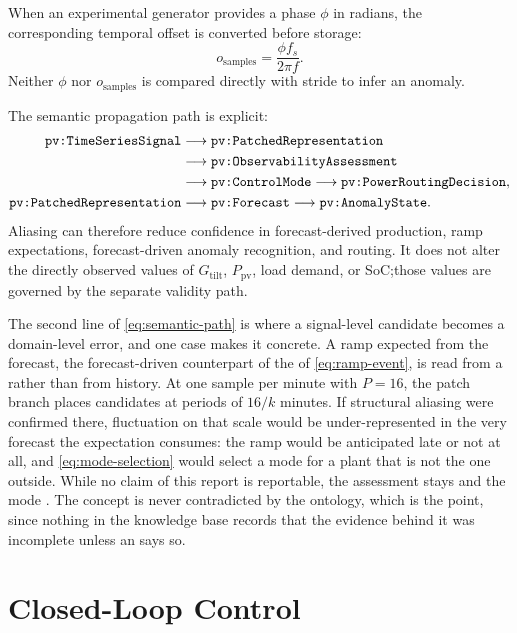 When an experimental generator provides a phase $\phi$ in radians, the corresponding temporal offset is converted before storage:
\begin{equation*}
o_{\mathrm{samples}}=\frac{\phi f_s}{2\pi f}.
\end{equation*}
Neither $\phi$ nor $o_{\mathrm{samples}}$ is compared directly with stride to infer an anomaly.

The semantic propagation path is explicit:
\begin{equation}
\begin{aligned}
\texttt{pv:TimeSeriesSignal}
&\longrightarrow \texttt{pv:PatchedRepresentation}\\
&\longrightarrow \texttt{pv:ObservabilityAssessment}\\
&\longrightarrow \texttt{pv:ControlMode}
\longrightarrow \texttt{pv:PowerRoutingDecision},\\
\texttt{pv:PatchedRepresentation}
&\longrightarrow \texttt{pv:Forecast}
\longrightarrow \texttt{pv:AnomalyState}.
\end{aligned}
\label{eq:semantic-path}
\end{equation}
Aliasing can therefore reduce confidence in forecast-derived production, ramp expectations, forecast-driven anomaly recognition, and routing. It does not alter the directly observed values of $G_{\mathrm{tilt}}$, $P_{\mathrm{pv}}$, load demand, or SoC;\@ those values are governed by the separate validity path.

The second line of \autoref{eq:semantic-path} is where a signal-level candidate becomes a domain-level error, and one case makes it concrete. A ramp expected from the forecast, the forecast-driven counterpart of the  of \autoref{eq:ramp-event}, is read from a  rather than from history. At one sample per minute with $P=16$, the patch branch places candidates at periods of $16/k$ minutes. If structural aliasing were confirmed there, fluctuation on that scale would be under-represented in the very forecast the expectation consumes: the ramp would be anticipated late or not at all, and \autoref{eq:mode-selection} would select a mode for a plant that is not the one outside. While no claim of this report is reportable, the assessment stays  and the mode . The concept is never contradicted by the ontology, which is the point, since nothing in the knowledge base records that the evidence behind it was incomplete unless an  says so.

\section{Closed-Loop Control}

